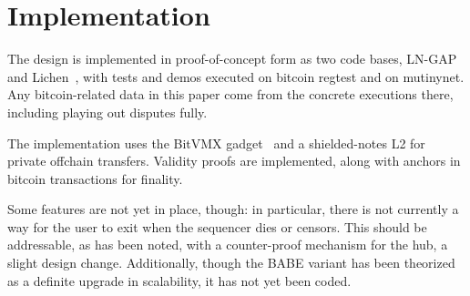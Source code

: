 \documentclass[11pt]{article}
\begin{document}
\section{Implementation}
\label{sec:status}

The design is implemented in proof-of-concept form as two code bases, LN-GAP~\cite{lngapcode} and Lichen~\cite{lichencode}, with tests and demos executed on bitcoin regtest and on mutinynet. Any bitcoin-related data in this paper come from the concrete executions there, including playing out disputes fully.

The implementation uses the BitVMX gadget~\cite{lichenbitvmx} and a shielded-notes L2 for private offchain transfers. Validity proofs are implemented, along with anchors in bitcoin transactions for finality.

Some features are not yet in place, though: in particular, there is not currently a way for the user to exit when the sequencer dies or censors. This should be addressable, as has been noted, with a counter-proof mechanism for the hub, a slight design change. Additionally, though the BABE variant has been theorized as a definite upgrade in scalability, it has not yet been coded.
\end{document}
